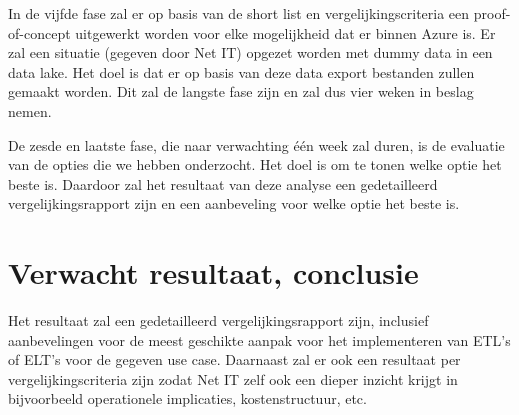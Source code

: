 In de vijfde fase zal er op basis van de short list en vergelijkingscriteria een proof-of-concept uitgewerkt worden voor elke mogelijkheid dat er binnen Azure is. Er zal een situatie (gegeven door Net IT) opgezet worden met dummy data in een data lake. Het doel is dat er op basis van deze data export bestanden zullen gemaakt worden. Dit zal de langste fase zijn en zal dus vier weken in beslag nemen.

De zesde en laatste fase, die naar verwachting één week zal duren, is de evaluatie van de opties die we hebben onderzocht. Het doel is om te tonen welke optie het beste is. Daardoor zal het resultaat van deze analyse een gedetailleerd vergelijkingsrapport zijn en een aanbeveling voor welke optie het beste is.


\section{Verwacht resultaat, conclusie}%
\label{sec:verwachte_resultaten}

Het resultaat zal een gedetailleerd vergelijkingsrapport zijn, inclusief aanbevelingen voor de meest geschikte aanpak voor het implementeren van ETL's of ELT's voor de gegeven use case. Daarnaast zal er ook een resultaat per vergelijkingscriteria zijn zodat Net IT zelf ook een dieper inzicht krijgt in bijvoorbeeld operationele implicaties, kostenstructuur, etc.
